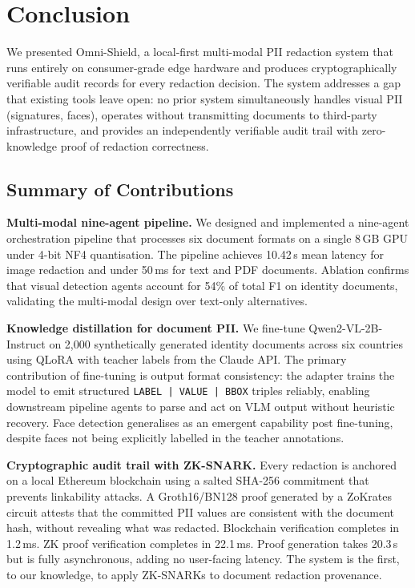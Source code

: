 \documentclass[conference]{IEEEtran}
\begin{document}
\section{Conclusion}
\label{sec:conclusion}

We presented Omni-Shield, a local-first multi-modal
PII redaction system that runs entirely on consumer-grade
edge hardware and produces cryptographically verifiable
audit records for every redaction decision.
The system addresses a gap that existing tools leave
open: no prior system simultaneously handles visual
PII (signatures, faces), operates without transmitting
documents to third-party infrastructure, and provides
an independently verifiable audit trail with
zero-knowledge proof of redaction correctness.

\subsection*{Summary of Contributions}

\textbf{Multi-modal nine-agent pipeline.}
We designed and implemented a nine-agent orchestration
pipeline that processes six document formats on a
single 8\,GB GPU under 4-bit NF4 quantisation.
The pipeline achieves 10.42\,s mean latency for image
redaction and under 50\,ms for text and PDF documents.
Ablation confirms that visual detection agents
account for 54\% of total F1 on identity documents,
validating the multi-modal design over text-only
alternatives.

\textbf{Knowledge distillation for document PII.}
We fine-tune Qwen2-VL-2B-Instruct on 2,000
synthetically generated identity documents across six
countries using QLoRA with teacher labels from the
Claude API.
The primary contribution of fine-tuning is output
format consistency: the adapter trains the model to
emit structured \texttt{LABEL\,|\,VALUE\,|\,BBOX}
triples reliably, enabling downstream pipeline agents
to parse and act on VLM output without heuristic
recovery.
Face detection generalises as an emergent capability
post fine-tuning, despite faces not being explicitly
labelled in the teacher annotations.

\textbf{Cryptographic audit trail with ZK-SNARK.}
Every redaction is anchored on a local Ethereum
blockchain using a salted SHA-256 commitment that
prevents linkability attacks.
A Groth16/BN128 proof generated by a ZoKrates circuit
attests that the committed PII values are consistent
with the document hash, without revealing what was
redacted.
Blockchain verification completes in 1.2\,ms.
ZK proof verification completes in 22.1\,ms.
Proof generation takes 20.3\,s but is fully
asynchronous, adding no user-facing latency.
The system is the first, to our knowledge, to apply
ZK-SNARKs to document redaction provenance.
\end{document}
